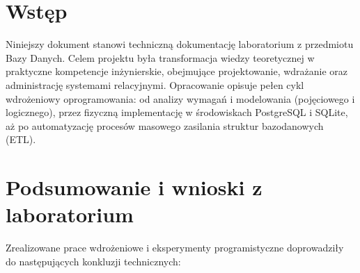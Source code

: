 \documentclass[a4paper,11pt,english,openany,oneside]{sphinxmanual}
\begin{document}
\section{Wstęp}
\label{\detokenize{rozdzial_1/index:wstep}}
\sphinxAtStartPar
Niniejszy dokument stanowi techniczną dokumentację laboratorium z przedmiotu Bazy Danych. Celem projektu była transformacja wiedzy teoretycznej w praktyczne kompetencje inżynierskie, obejmujące projektowanie, wdrażanie oraz administrację systemami relacyjnymi. Opracowanie opisuje pełen cykl wdrożeniowy oprogramowania: od analizy wymagań i modelowania (pojęciowego i logicznego), przez fizyczną implementację w środowiskach PostgreSQL i SQLite, aż po automatyzację procesów masowego zasilania struktur bazodanowych (ETL).


\section{Podsumowanie i wnioski z laboratorium}
\label{\detokenize{rozdzial_1/index:podsumowanie-i-wnioski-z-laboratorium}}
\sphinxAtStartPar
Zrealizowane prace wdrożeniowe i eksperymenty programistyczne doprowadziły do następujących konkluzji technicznych:
\end{document}
